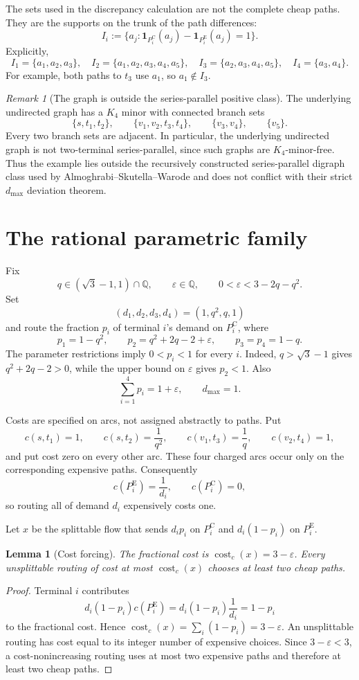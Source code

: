 \documentclass[11pt]{article}
\newtheorem{lemma}[theorem]{Lemma}
\theoremstyle{remark}
\newtheorem{remark}[theorem]{Remark}
\newcommand{\Q}{\mathbb{Q}}
\newcommand{\cost}{\operatorname{cost}}
\newcommand{\Epath}{P^{\mathrm E}}
\newcommand{\Cpath}{P^{\mathrm C}}
\begin{document}
The sets used in the discrepancy calculation are not the complete cheap
paths.  They are the supports on the trunk of the path differences:
\[
 I_i:=\{a_j:\mathbf 1_{\Cpath_i}(a_j)-
                    \mathbf 1_{\Epath_i}(a_j)=1\}.
\]
Explicitly,
\[
 I_1=\{a_1,a_2,a_3\},\quad
 I_2=\{a_1,a_2,a_3,a_4,a_5\},\quad
 I_3=\{a_2,a_3,a_4,a_5\},\quad
 I_4=\{a_3,a_4\}.
\]
For example, both paths to $t_3$ use $a_1$, so $a_1\notin I_3$.

\begin{remark}[The graph is outside the series-parallel positive class]
The underlying undirected graph has a $K_4$ minor with connected branch sets
\[
 \{s,t_1,t_2\},\qquad
 \{v_1,v_2,t_3,t_4\},\qquad
 \{v_3,v_4\},\qquad
 \{v_5\}.
\]
Every two branch sets are adjacent.  In particular, the underlying
undirected graph is not two-terminal series-parallel, since such graphs are
$K_4$-minor-free.  Thus the example lies outside the recursively constructed
series-parallel digraph class used by Almoghrabi--Skutella--Warode and does not
conflict with their strict $d_{\max}$ deviation theorem.
\end{remark}

\section{The rational parametric family}

Fix
\[
 q\in(\sqrt3-1,1)\cap\Q,
 \qquad
 \varepsilon\in\Q,
 \qquad
 0<\varepsilon<3-2q-q^2.
\]
Set
\[
 (d_1,d_2,d_3,d_4)=(1,q^2,q,1)
\]
and route the fraction $p_i$ of terminal $i$'s demand on $\Cpath_i$, where
\[
 p_1=1-q^2,\qquad
 p_2=q^2+2q-2+\varepsilon,\qquad
 p_3=p_4=1-q.
\]
The parameter restrictions imply $0<p_i<1$ for every $i$.  Indeed,
$q>\sqrt3-1$ gives $q^2+2q-2>0$, while the upper bound on $\varepsilon$
gives $p_2<1$.  Also
\[
 \sum_{i=1}^4p_i=1+\varepsilon,
 \qquad d_{\max}=1.
\]

Costs are specified on arcs, not assigned abstractly to paths.  Put
\[
 c(s,t_1)=1,\qquad c(s,t_2)=\frac1{q^2},\qquad
 c(v_1,t_3)=\frac1q,\qquad c(v_2,t_4)=1,
\]
and put cost zero on every other arc.  These four charged arcs occur only on
the corresponding expensive paths.  Consequently
\[
 c(\Epath_i)=\frac1{d_i},\qquad c(\Cpath_i)=0,
\]
so routing all of demand $d_i$ expensively costs one.

Let $x$ be the splittable flow that sends $d_ip_i$ on $\Cpath_i$ and
$d_i(1-p_i)$ on $\Epath_i$.

\begin{lemma}[Cost forcing]\label{lem:cost}
The fractional cost is $\cost_c(x)=3-\varepsilon$.  Every unsplittable
routing of cost at most $\cost_c(x)$ chooses at least two cheap paths.
\end{lemma}
\begin{proof}
Terminal $i$ contributes
\[
 d_i(1-p_i)c(\Epath_i)=d_i(1-p_i)\frac1{d_i}=1-p_i
\]
to the fractional cost.  Hence
$\cost_c(x)=\sum_i(1-p_i)=3-\varepsilon$.
An unsplittable routing has cost equal to its integer number of expensive
choices.  Since $3-\varepsilon<3$, a cost-nonincreasing routing uses at most
two expensive paths and therefore at least two cheap paths.
\end{proof}
\end{document}
